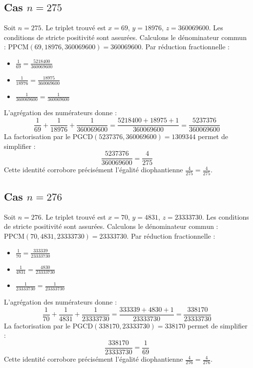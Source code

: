 \documentclass[11pt,a4paper]{article}
\begin{document}
\subsection{Cas $n = 275$}
Soit $n = 275$. Le triplet trouvé est $x = 69$, $y = 18976$, $z = 360069600$.
Les conditions de stricte positivité sont assurées.
Calculons le dénominateur commun : $\text{PPCM}(69, 18976, 360069600) = 360069600$.
Par réduction fractionnelle :
\begin{itemize}
    \item $\frac{1}{69} = \frac{5218400}{360069600}$
    \item $\frac{1}{18976} = \frac{18975}{360069600}$
    \item $\frac{1}{360069600} = \frac{1}{360069600}$
\end{itemize}
L'agrégation des numérateurs donne :
$$ \frac{1}{69} + \frac{1}{18976} + \frac{1}{360069600} = \frac{5218400 + 18975 + 1}{360069600} = \frac{5237376}{360069600} $$
La factorisation par le $\text{PGCD}(5237376, 360069600) = 1309344$ permet de simplifier :
$$ \frac{5237376}{360069600} = \frac{4}{275} $$
Cette identité corrobore précisément l'égalité diophantienne $\frac{4}{275} = \frac{4}{275}$.

\subsection{Cas $n = 276$}
Soit $n = 276$. Le triplet trouvé est $x = 70$, $y = 4831$, $z = 23333730$.
Les conditions de stricte positivité sont assurées.
Calculons le dénominateur commun : $\text{PPCM}(70, 4831, 23333730) = 23333730$.
Par réduction fractionnelle :
\begin{itemize}
    \item $\frac{1}{70} = \frac{333339}{23333730}$
    \item $\frac{1}{4831} = \frac{4830}{23333730}$
    \item $\frac{1}{23333730} = \frac{1}{23333730}$
\end{itemize}
L'agrégation des numérateurs donne :
$$ \frac{1}{70} + \frac{1}{4831} + \frac{1}{23333730} = \frac{333339 + 4830 + 1}{23333730} = \frac{338170}{23333730} $$
La factorisation par le $\text{PGCD}(338170, 23333730) = 338170$ permet de simplifier :
$$ \frac{338170}{23333730} = \frac{1}{69} $$
Cette identité corrobore précisément l'égalité diophantienne $\frac{4}{276} = \frac{4}{276}$.
\end{document}
